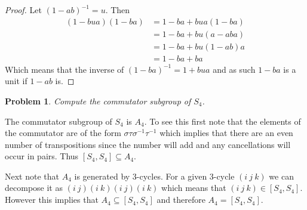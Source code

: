 \documentclass[10pt]{article}
\newcommand{\sk}{\vskip 10mm}
\theoremstyle{plain}
\newtheorem{problem}{Problem}
\theoremstyle{remark}
\begin{document}
\begin{proof}
  Let $(1-ab)^{-1}=u$. Then
  \begin{align*}
    (1-bua)(1-ba) &= 1-ba+bua(1-ba)\\
                  &= 1-ba+bu(a-aba)\\
                  &= 1-ba+bu(1-ab)a\\
                  &= 1-ba+ba
  \end{align*}
  Which means that the inverse of $(1-ba)^{-1}=1+bua$ and as such $1-ba$ is a
  unit if $1-ab$ is.
\end{proof}

\sk

\begin{problem} 
  Compute the commutator subgroup of $S_4$.
\end{problem}

The commutator subgroup of $S_4$ is $A_4$. To see this first note that
the elements of the commutator are of the form $\sigma\tau\sigma^{-1}\tau^{-1}$ which
implies that there are an even number of transpositions since the number
will add and any cancellations will occur in pairs. Thus $[S_4,S_4]\subseteq A_4$.

Next note that $A_4$ is generated by 3-cycles. For a given 3-cycle
$(i\ j\ k)$ we can decompose it as $(i\ j)(i\ k)(i\ j)(i\ k)$
which means that $(i\ j\ k)\in [S_4,S_4]$. However this implies that
$A_4\subseteq [S_4,S_4]$ and therefore $A_4=[S_4,S_4]$.


\sk

\end{document}
